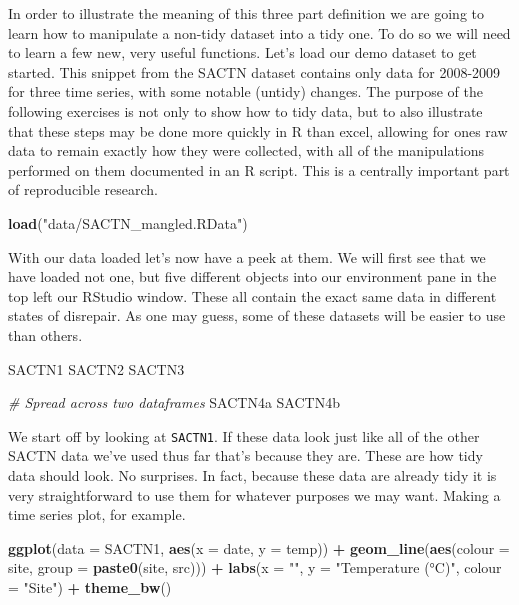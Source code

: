 \documentclass[
]{book}
\newenvironment{Shaded}{\begin{snugshade}}{\end{snugshade}}
\newcommand{\CommentTok}[1]{\textcolor[rgb]{0.56,0.35,0.01}{\textit{#1}}}
\newcommand{\DataTypeTok}[1]{\textcolor[rgb]{0.13,0.29,0.53}{#1}}
\newcommand{\KeywordTok}[1]{\textcolor[rgb]{0.13,0.29,0.53}{\textbf{#1}}}
\newcommand{\NormalTok}[1]{#1}
\newcommand{\OperatorTok}[1]{\textcolor[rgb]{0.81,0.36,0.00}{\textbf{#1}}}
\newcommand{\StringTok}[1]{\textcolor[rgb]{0.31,0.60,0.02}{#1}}
\begin{document}
In order to illustrate the meaning of this three part definition we are going to learn how to manipulate a non-tidy dataset into a tidy one. To do so we will need to learn a few new, very useful functions. Let's load our demo dataset to get started. This snippet from the SACTN dataset contains only data for 2008-2009 for three time series, with some notable (untidy) changes. The purpose of the following exercises is not only to show how to tidy data, but to also illustrate that these steps may be done more quickly in R than excel, allowing for ones raw data to remain exactly how they were collected, with all of the manipulations performed on them documented in an R script. This is a centrally important part of reproducible research.

\begin{Shaded}
\begin{Highlighting}[]
\KeywordTok{load}\NormalTok{(}\StringTok{"data/SACTN\_mangled.RData"}\NormalTok{)}
\end{Highlighting}
\end{Shaded}

With our data loaded let's now have a peek at them. We will first see that we have loaded not one, but five different objects into our environment pane in the top left our RStudio window. These all contain the exact same data in different states of disrepair. As one may guess, some of these datasets will be easier to use than others.

\begin{Shaded}
\begin{Highlighting}[]
\NormalTok{SACTN1}
\NormalTok{SACTN2}
\NormalTok{SACTN3}

\CommentTok{\# Spread across two dataframes}
\NormalTok{SACTN4a}
\NormalTok{SACTN4b}
\end{Highlighting}
\end{Shaded}

We start off by looking at \texttt{SACTN1}. If these data look just like all of the other SACTN data we've used thus far that's because they are. These are how tidy data should look. No surprises. In fact, because these data are already tidy it is very straightforward to use them for whatever purposes we may want. Making a time series plot, for example.

\begin{Shaded}
\begin{Highlighting}[]
\KeywordTok{ggplot}\NormalTok{(}\DataTypeTok{data =}\NormalTok{ SACTN1, }\KeywordTok{aes}\NormalTok{(}\DataTypeTok{x =}\NormalTok{ date, }\DataTypeTok{y =}\NormalTok{ temp)) }\OperatorTok{+}
\StringTok{  }\KeywordTok{geom\_line}\NormalTok{(}\KeywordTok{aes}\NormalTok{(}\DataTypeTok{colour =}\NormalTok{ site, }\DataTypeTok{group =} \KeywordTok{paste0}\NormalTok{(site, src))) }\OperatorTok{+}
\StringTok{  }\KeywordTok{labs}\NormalTok{(}\DataTypeTok{x =} \StringTok{""}\NormalTok{, }\DataTypeTok{y =} \StringTok{"Temperature (°C)"}\NormalTok{, }\DataTypeTok{colour =} \StringTok{"Site"}\NormalTok{) }\OperatorTok{+}
\StringTok{  }\KeywordTok{theme\_bw}\NormalTok{()}
\end{Highlighting}
\end{Shaded}
\end{document}

